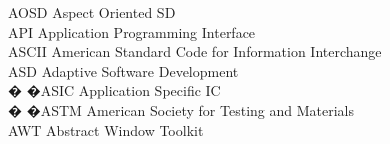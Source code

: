 \begin{tabbing}
    \>AOSD \>\>Aspect Oriented SD\\

    \>API \>\>Application Programming Interface\\




    \>ASCII \>\>American Standard Code for Information Interchange\\

    \>ASD \>\>Adaptive Software Development\\


 � �\>ASIC \>\>Application Specific IC\\




 � �\>ASTM \>\>American Society for Testing and Materials\\







    \>AWT \>\>Abstract Window Toolkit\\



\end{tabbing}
